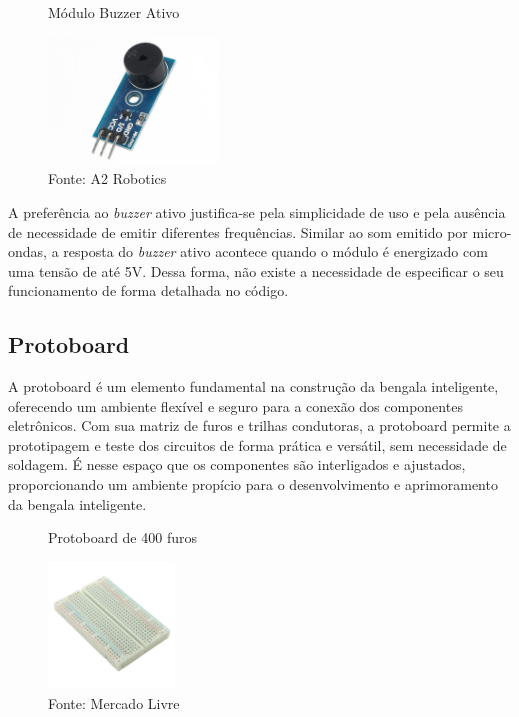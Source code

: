        \begin{figure}[h!]
        \captionsetup{width=1\textwidth}
        \caption{\label{fig:buzzer}Módulo Buzzer Ativo}
        \centering
        \includegraphics[width=0.4\textwidth]{figuras/buzzer} 
        \caption*{Fonte: A2 Robotics}
    \end{figure}

    A preferência ao \textit{buzzer} ativo justifica-se pela simplicidade de uso e pela ausência de necessidade de emitir diferentes frequências. Similar ao som emitido por micro-ondas, a resposta do \textit{buzzer} ativo acontece quando o módulo é energizado com uma tensão de até 5V. Dessa forma, não existe a necessidade de especificar o seu funcionamento de forma detalhada no código. 
    
    \subsection{Protoboard}
    A protoboard é um elemento fundamental na construção da bengala inteligente, oferecendo um ambiente flexível e seguro para a conexão dos componentes eletrônicos. Com sua matriz de furos e trilhas condutoras, a protoboard permite a prototipagem e teste dos circuitos de forma prática e versátil, sem necessidade de soldagem. É nesse espaço que os componentes são interligados e ajustados, proporcionando um ambiente propício para o desenvolvimento e aprimoramento da bengala inteligente.

    \begin{figure}[h!]
        \captionsetup{width=1\textwidth}
        \caption{\label{fig:protoboard} Protoboard de 400 furos}
        \centering
        \includegraphics[width=0.3\textwidth]{figuras/protoboard} 
        \caption*{Fonte: Mercado Livre}
    \end{figure}

